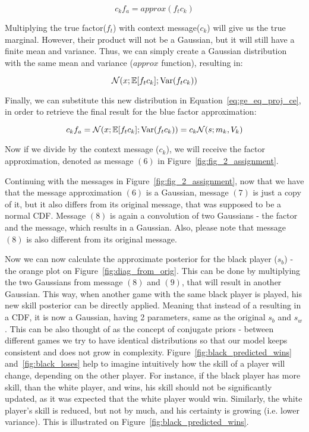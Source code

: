 \documentclass[a4paper,11pt]{article}
\theoremstyle{mytheor}
\newcommand{\E}{\Bbb{E}}
\newcommand{\Var}{\mathrm{Var}}
\begin{document}
\begin{equation}
    \label{eq:ge_eq_proj_ce}
    c_kf_a = approx(f_tc_k)
\end{equation}

Multiplying the true factor($f_t$) with context message($c_k$) will give us the true marginal. However, their product will not be a Gaussian, but it will still have a finite mean and variance. Thus, we can simply create a Gaussian distribution with the same mean and variance ($approx$ function), resulting in:

\begin{equation}
    \label{eq:approx_gaus}
    \mathcal{N}(x;\E[f_tc_k];\Var(f_tc_k))
\end{equation}

Finally, we can substitute this new distribution in Equation~\ref{eq:ge_eq_proj_ce}, in order to retrieve the final result for the blue factor approximation:

\begin{equation}
    \label{eq:g_eq_proj_ce_div_c}
    c_kf_a = \mathcal{N}(x;\E[f_tc_k];\Var(f_tc_k))=c_k\mathcal{N}(s;m_k,V_k)
\end{equation}

Now if we divide by the context message ($c_k$), we will receive the factor approximation, denoted as message $(6)$ in Figure~\ref{fig:fig_2_assignment}.

Continuing with the messages in Figure~\ref{fig:fig_2_assignment}, now that we have that the message approximation $(6)$ is a Gaussian, message $(7)$ is just a copy of it, but it also differs from its original message, that was supposed to be a normal CDF. Message $(8)$ is again a convolution of two Gaussians - the factor and the message, which results in a Gaussian. Also, please note that message $(8)$ is also different from its original message. 

Now we can now calculate the approximate posterior for the black player ($s_b$) - the orange plot on Figure~\ref{fig:diag_from_orig}. This can be done by multiplying the two Gaussians from message $(8)$ and $(9)$, that will result in another Gaussian. This way, when another game with the same black player is played, his new skill posterior can be directly applied. Meaning that instead of a resulting in a CDF, it is now a Gaussian, having 2 parameters, same as the original $s_b$ and $s_w$. This can be also thought of as the concept of conjugate priors - between different games we try to have identical distributions so that our model keeps consistent and does not grow in complexity. Figure~\ref{fig:black_predicted_wins} and~\ref{fig:black_loses} help to imagine intuitively how the skill of a player will change, depending on the other player. For instance, 
if the black player has more skill, than the white player, and wins, his skill should not be significantly updated, as it was expected that the white player would win. Similarly, the white player's skill is reduced, but not by much, and his certainty is growing (i.e. lower variance). This is illustrated on Figure~\ref{fig:black_predicted_wins}.
\end{document}
